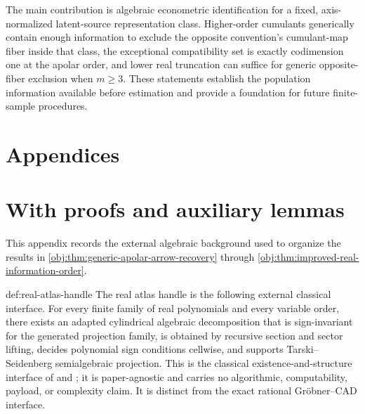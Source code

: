 \documentclass[11pt]{article}
\begin{document}
The main contribution is algebraic econometric identification for a fixed, axis-normalized latent-source representation class. Higher-order cumulants generically contain enough information to exclude the opposite convention's cumulant-map fiber inside that class, the exceptional compatibility set is exactly codimension one at the apolar order, and lower real truncation can suffice for generic opposite-fiber exclusion when \(m\ge3\). These statements establish the population information available before estimation and provide a foundation for future finite-sample procedures.


\appendix

\section*{Appendices}

\section{With proofs and auxiliary lemmas}

This appendix records the external algebraic background used to organize the results in \cref{obj:thm:generic-apolar-arrow-recovery} through \cref{obj:thm:improved-real-information-order}.

\begin{remarkv}{def:real-atlas-handle}
The real atlas handle is the following external classical interface.  For every finite family of real polynomials and every variable order, there exists an adapted cylindrical algebraic decomposition that is sign-invariant for the generated projection family, is obtained by recursive section and sector lifting, decides polynomial sign conditions cellwise, and supports Tarski--Seidenberg semialgebraic projection.  This is the classical existence-and-structure interface of \citet[Section~2.3 and Theorem~2.2.1]{BochnakCosteRoy1998} and \citet[Chapter~5]{BasuPollackRoy2006}; it is paper-agnostic and carries no algorithmic, computability, payload, or complexity claim.  It is distinct from the exact rational Gröbner--CAD interface.
\end{remarkv}
\end{document}
